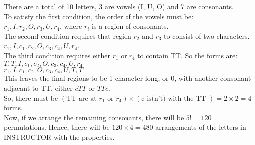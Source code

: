 \documentclass[12pt]{article}
\begin{document}
\begin{solution}
    There are a total of 10 letters, 3 are vowels (I, U, O) and 7 are 
    consonants. \\
    To satisfy the first condition, the order of the vowels must be: \\
    $r_1,I, r_2, O, r_3, U, r_4$, where $r_i$ is a region of consonants. \\
    The second condition requires that region $r_2$ and $r_3$ to consist 
    of two characters. $r_1, I, c_1, c_2, O, c_3, c_4, U, r_4$. \\
    The third condition requires either $r_1$ or $r_4$ to contain TT. So 
    the forms are: \\
    $T, T, I, c_1, c_2, O, c_3, c_4, U, r_4$ \\
    $r_1, I, c_1, c_2, O, c_3, c_4, U, T, T$ \\
    This leaves the final regions to be 1 character long, or 0, with 
    another consonant adjacant to TT, either $cTT$ or $TTc$. \\
    So, there must be $(\text{TT are at }r_1 \text{ or } r_4) \times 
    (\text{c is(n't) with the TT }) = 2 \times 2 = 4$ 
    forms. \\
    Now, if we arrange the remaining consonants, there will be $5!=120$ 
    permutations. Hence, there will be $120 \times 4 = 480$ arrangements 
    of the letters in INSTRUCTOR with the properties. 
\end{solution}
\end{document}
